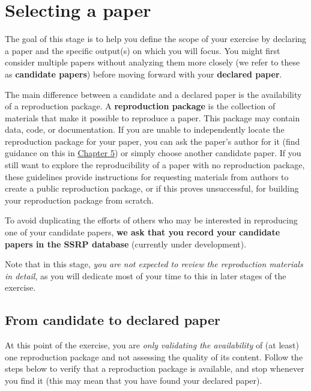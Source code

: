 \documentclass[
]{book}
\begin{document}
\hypertarget{select}{%
\chapter{Selecting a paper}\label{select}}

The goal of this stage is to help you define the scope of your exercise by declaring a paper and the specific output(s) on which you will focus. You might first consider multiple papers without analyzing them more closely (we refer to these as \textbf{candidate papers}) before moving forward with your \textbf{declared paper}.

The main difference between a candidate and a declared paper is the availability of a reproduction package. A \textbf{reproduction package} is the collection of materials that make it possible to reproduce a paper. This package may contain data, code, or documentation. If you are unable to independently locate the reproduction package for your paper, you can ask the paper's author for it (find guidance on this in \href{https://bitss.github.io/ACRE/guidance-for-a-constructive-exchange-between-reproducers-and-original-authors.html}{Chapter 5}) or simply choose another candidate paper. If you still want to explore the reproducibility of a paper with no reproduction package, these guidelines provide instructions for requesting materials from authors to create a public reproduction package, or if this proves unsuccessful, for building your reproduction package from scratch.

To avoid duplicating the efforts of others who may be interested in reproducing one of your candidate papers, \textbf{we ask that you record your candidate papers in the SSRP database} (currently under development).

Note that in this stage, \emph{you are not expected to review the reproduction materials in detail}, as you will dedicate most of your time to this in later stages of the exercise.

\hypertarget{declare}{%
\section{From candidate to declared paper}\label{declare}}

At this point of the exercise, you are \emph{only validating the availability} of (at least) one reproduction package and not assessing the quality of its content. Follow the steps below to verify that a reproduction package is available, and stop whenever you find it (this may mean that you have found your declared paper).
\end{document}
